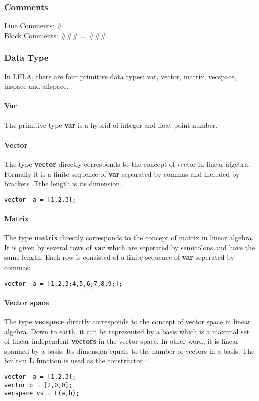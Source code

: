 \documentclass[12pt]{article} %
\begin{document}
\subsubsection{Comments}
Line Comments: \# \\
\indent Block Comments: \#\#\# ... \#\#\#

\subsubsection{Data Type}
In LFLA, there are four primitive data types: var, vector, matrix, vecspace, inspace and affspace.

\paragraph{Var}
The primitive type \textbf{var} is a hybrid of integer and float point number.
	
	
\paragraph{Vector}
The type \textbf{vector} directly corresponds to the concept of vector in linear algebra. Formally it is a finite sequence of \textbf{var} separated by commas and  included by brackets .Tthe length is its dimension.    
 
\begin{lstlisting}
vector  a = [1,2,3];
\end{lstlisting}
 
\paragraph{Matrix} 
The type \textbf{matrix}  directly corresponds to the concept of  matrix in linear algebra. It is given by  several rows of  \textbf{var} which are seperated by  semicolons and have the same length. Each row is consisted of a finite sequence of  \textbf{var} seperated by commas:
 
\begin{lstlisting}
vector  a = [1,2,3;4,5,6;7,8,9;];
\end{lstlisting}

\paragraph{Vector space}
The type \textbf{vecspace}  directly corresponds to the concept of vector space in linear algebra. Down to earth, it can be represented by  a basis which is a maximal set of linear independent \textbf{vectors} in the vector space. In other word, it is linear spanned by a basis. Its dimension equals to the number of vectors in a basis. The built-in \textbf{L} function is used as the constructor :
\begin{lstlisting}
vector  a = [1,2,3];
vector b = [2,0,0];
vecspace vs = L(a,b);
\end{lstlisting}
\end{document}
